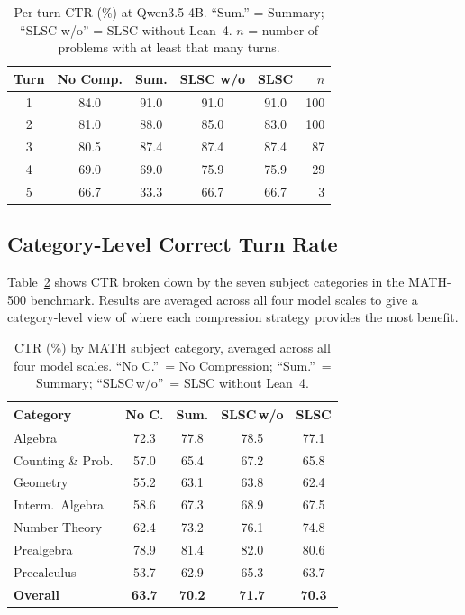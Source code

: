 \begin{table}[h]
\centering
\small
\setlength{\tabcolsep}{4pt}
\begin{tabular}{ccccc r}
\toprule
\textbf{Turn} & \textbf{No Comp.} & \textbf{Sum.} & \textbf{SLSC w/o} & \textbf{SLSC} & \textbf{$n$} \\
\midrule
1 & 84.0 & 91.0 & 91.0 & 91.0 & 100 \\
2 & 81.0 & 88.0 & 85.0 & 83.0 & 100 \\
3 & 80.5 & 87.4 & 87.4 & 87.4 &  87 \\
4 & 69.0 & 69.0 & 75.9 & 75.9 &  29 \\
5 & 66.7 & 33.3 & 66.7 & 66.7 &   3 \\
\bottomrule
\end{tabular}
\caption{Per-turn CTR (\%) at Qwen3.5-4B. ``Sum.'' = Summary; ``SLSC w/o'' = SLSC without Lean~4. $n$ = number of problems with at least that many turns.}
\label{tab:per_turn_4b}
\end{table}

\subsection{Category-Level Correct Turn Rate}
\label{app:category}

Table~\ref{tab:category_ctr} shows CTR broken down by the seven subject categories in the MATH-500 benchmark. Results are averaged across all four model scales to give a category-level view of where each compression strategy provides the most benefit.

\begin{table}[h]
\centering
\footnotesize
\setlength{\tabcolsep}{3pt}
\begin{tabular}{lcccc}
\toprule
\textbf{Category} & \textbf{No C.} & \textbf{Sum.} & \textbf{SLSC\,w/o} & \textbf{SLSC} \\
\midrule
Algebra              & 72.3 & 77.8 & 78.5 & 77.1 \\
Counting \& Prob.    & 57.0 & 65.4 & 67.2 & 65.8 \\
Geometry             & 55.2 & 63.1 & 63.8 & 62.4 \\
Interm.\ Algebra     & 58.6 & 67.3 & 68.9 & 67.5 \\
Number Theory        & 62.4 & 73.2 & 76.1 & 74.8 \\
Prealgebra           & 78.9 & 81.4 & 82.0 & 80.6 \\
Precalculus          & 53.7 & 62.9 & 65.3 & 63.7 \\
\midrule
\textbf{Overall}     & \textbf{63.7} & \textbf{70.2} & \textbf{71.7} & \textbf{70.3} \\
\bottomrule
\end{tabular}
\caption{CTR (\%) by MATH subject category, averaged across all four model scales. ``No C.''~= No Compression; ``Sum.''~= Summary; ``SLSC\,w/o''~= SLSC without Lean~4.}
\label{tab:category_ctr}
\end{table}

